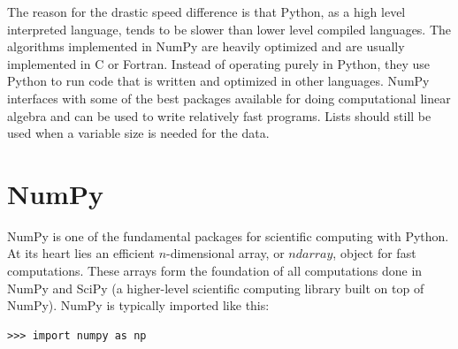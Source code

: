 %

The reason for the drastic speed difference is that Python, as a high level interpreted language, tends to be slower than lower level compiled languages.
The algorithms implemented in NumPy are heavily optimized and are usually implemented in C or Fortran.
Instead of operating purely in Python, they use Python to run code that is written and optimized in other languages.
NumPy interfaces with some of the best packages available for doing computational linear algebra and can be used to write relatively fast programs.
Lists should still be used when a variable size is needed for the data.

\section*{NumPy}
NumPy is one of the fundamental packages for scientific computing with Python.
At its heart lies an efficient $n$-dimensional array, or $ndarray$, object for fast computations.
These arrays form the foundation of all computations done in NumPy and SciPy (a higher-level scientific computing library built on top of NumPy).
NumPy is typically imported like this:
\begin{lstlisting}
>>> import numpy as np
\end{lstlisting}

